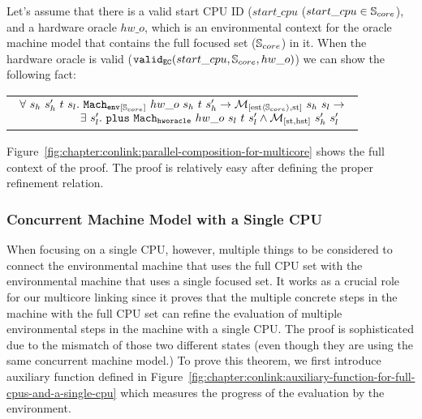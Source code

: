 \begin{lemma}
\label{lemma:chapter:conlink:mc-oracle-env}
Let's assume that there is a valid start CPU ID
($start\_cpu$ ($start\_cpu \in {\mathbb{S}_{core}}$), and a hardware oracle $hw\_o$,  
which is an environmental context for the oracle machine model that contains the full focused set (${\mathbb{S}_{core}}$) in it.
When the hardware oracle is valid ($ {{\mathrm{\texttt{valid}}}_{{\mathrm{\texttt{EC}}}}}({start\_cpu}, {{\mathbb{S}_{core}}}, {hw\_o})$) we can show the following fact:
\begin{center}
\begin{tabular}{P{0.95\textwidth}}
$
\begin{array}{l}
\forall \ s_h \ s_h' \ t \ s_l . \ {{{{\mathrm{\texttt{Mach}}}}_{{\mathrm{\texttt{env}}}}}_{[{{\mathbb{S}_{core}}}]}~{hw\_o }~{s_h}~{t}~{s_h'}} \rightarrow  {{\mathcal{M}_{[\mathrm{est}\langle{\mathbb{S}_{core}}\rangle,\mathrm{st}]}}~{s_h}~{s_l}} \rightarrow \\
\ \ \ \ \ \ \ \ \ \ \ \ \ \ \ \ \exists\ s_l' . \  {{{\mathrm{\texttt{plus}}}}~{{{{{{\mathrm{\texttt{Mach}}}}_{{\mathrm{\texttt{hworacle}}}}}}~{hw\_o }~{s_l}~{t}~{s_l'}}}} \wedge  {{\mathcal{M}_{[\mathrm{st},\mathrm{hst}]}}~{s_h'}~{s_l'}}\\
\end{array}
$\\
\end{tabular}
\end{center}
\end{lemma}

Figure~\ref{fig:chapter:conlink:parallel-composition-for-multicore} shows the full context of the proof. 
The proof is relatively easy after defining the proper refinement relation. 

\subsubsection{Concurrent Machine Model with a Single CPU}


When focusing on a single CPU, however, 
multiple things to be considered to connect the environmental machine that uses the full CPU set  
with the environmental machine that uses a single focused set.
It works as a crucial role 
for our multicore linking since it proves that the multiple concrete steps  in the machine with the full CPU set can
 refine the evaluation of multiple environmental steps in the machine with a single CPU.
The proof is sophisticated due to the mismatch of those two different states (even though they are 
using the same concurrent machine model.)
To prove this theorem, 
we first introduce auxiliary function defined in Figure~\ref{fig:chapter:conlink:auxiliary-function-for-full-cpus-and-a-single-cpu}
which measures the progress of the evaluation by the environment. 

